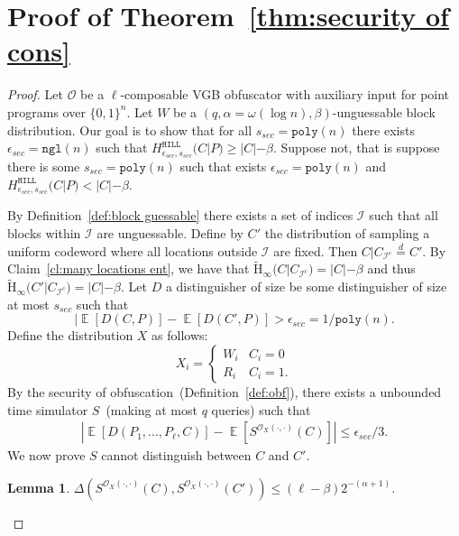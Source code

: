 \documentclass[11pt]{article}
\newcommand{\thref}[1]{\mbox{Theorem~\ref{#1}}}
\newcommand{\defref}[1]{\mbox{Definition~\ref{#1}}}
\newcommand{\clref}[1]{\mbox{Claim~\ref{#1}}}
\DeclareMathOperator*{\expe}{\mathbb{E}}
\newcommand{\zo}{\ensuremath{\{0, 1\}}}
\newcommand{\hill}{\ensuremath{\mathtt{HILL}}\xspace}
\newcommand{\poly}{\ensuremath{\mathtt{poly}}\xspace}
\newcommand{\ngl}{\ensuremath{\mathtt{ngl}}\xspace}
\newcommand{\Hav}{\tilde{\mathrm{H}}_\infty}
\newtheorem{lemma}[theorem]{Lemma}
\begin{document}
\section{Proof of \thref{thm:security of cons}}
\label{app:security of main cons}
\begin{proof}

Let $\mathcal{O}$ be a $\ell$-composable VGB obfuscator with auxiliary input for point programs over $\zo^n$.  Let $W$ be a $(q, \alpha = \omega(\log n), \beta)$-unguessable block distribution.  Our goal is to show that for all $s_{sec} = \poly(n)$ there exists $\epsilon_{sec} =\ngl(n)$ such that $H^{\hill}_{\epsilon_{sec}, s_{sec}}(C|P)\geq |C|- \beta$. %
Suppose not, that is suppose there is some $s_{sec} = \poly(n)$ such that exists $\epsilon_{sec} = \poly(n)$ and $H^{\hill}_{\epsilon_{sec}, s_{sec}}(C|P) < |C|-\beta$.

By \defref{def:block guessable} there exists a set of indices $\mathcal{I}$ such that all blocks within $\mathcal{I}$ are unguessable.  Define by $C'$ the distribution of sampling a uniform codeword where all locations outside $\mathcal{I}$ are fixed.  Then $C | C_{\mathcal{I}^c} \overset{d}=C'$.  By \clref{cl:many locations ent}, we have that $\Hav(C|C_{\mathcal{I}^c} )= |C| -\beta$ and thus $\Hav(C'| C_{\mathcal{I}^c}) = |C| -\beta$.  
Let $D$ a distinguisher of size be some distinguisher of size at most $s_{sec}$ such that 
\[
| \expe[D(C, P)] - \expe[D(C', P)] > \epsilon_{sec} = 1/\poly(n).
\]  
Define the distribution $X$ as follows:
\[X_i =
\begin{cases}
W_i & C_i = 0\\
R_i & C_i = 1.
\end{cases}\]  By the security of obfuscation~(\defref{def:obf}), there exists a unbounded time simulator $S$~(making at most $q$ queries) such that
\begin{align}
\label{eq:dist before}
|\expe [D(P_1,..., P_\ell, C)] - \expe [S^{\mathcal{O}_X(\cdot, \cdot)}(C)] |\leq \epsilon_{sec}/3.
\end{align}
We now prove $S$ cannot distinguish between $C$ and $C'$.
\begin{lemma}
\label{lem:sim cannot distinguish}
$\Delta(S^{\mathcal{O}_X(\cdot, \cdot)}(C), S^{\mathcal{O}_X(\cdot, \cdot)}(C')) \le (\ell-\beta) 2^{-(\alpha+1)}$.
\end{lemma}


\end{proof}
\end{document}
